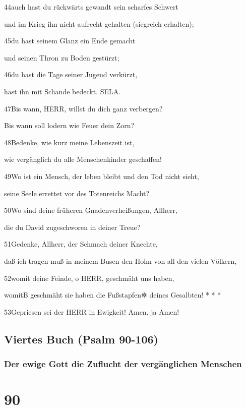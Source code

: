 44auch hast du rückwärts gewandt sein scharfes Schwert

und im Krieg ihn nicht aufrecht gehalten (siegreich erhalten);

45du hast seinem Glanz ein Ende gemacht

und seinen Thron zu Boden gestürzt;

46du hast die Tage seiner Jugend verkürzt,

hast ihn mit Schande bedeckt. SELA.

47Bis wann, HERR, willst du dich ganz verbergen?

Bis wann soll lodern wie Feuer dein Zorn?

48Bedenke, wie kurz meine Lebenszeit ist,

wie vergänglich du alle Menschenkinder geschaffen!

49Wo ist ein Mensch, der leben bleibt und den Tod nicht sieht,

seine Seele errettet vor des Totenreichs Macht?

50Wo sind deine früheren Gnadenverheißungen, Allherr,

die du David zugeschworen in deiner Treue?

51Gedenke, Allherr, der Schmach deiner Knechte,

daß ich tragen muß in meinem Busen den Hohn von all den vielen Völkern,

52womit deine Feinde, o HERR, geschmäht uns haben,

womit{B} geschmäht sie haben die Fußstapfen✲ deines Gesalbten! * * *

53Gepriesen sei der HERR in Ewigkeit! Amen, ja Amen!

\hypertarget{viertes-buch-psalm-90-106}{%
\subsection{Viertes Buch (Psalm
90-106)}\label{viertes-buch-psalm-90-106}}

\hypertarget{der-ewige-gott-die-zuflucht-der-verguxe4nglichen-menschen}{%
\subsubsection{Der ewige Gott die Zuflucht der vergänglichen
Menschen}\label{der-ewige-gott-die-zuflucht-der-verguxe4nglichen-menschen}}

\hypertarget{section-89}{%
\section{90}\label{section-89}}


